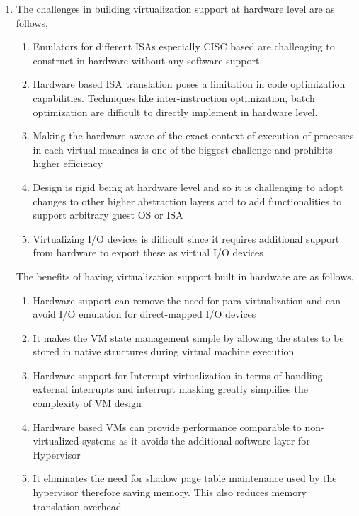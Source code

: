\documentclass[11pt,a4paper,oneside]{article}
\begin{document}
\begin{enumerate}
	    \begin{Verbatim}
	    	      
	    \end{Verbatim}   
		
		\item The challenges in building virtualization support at hardware level are as follows,
			\begin{enumerate}
				\item Emulators for different ISAs especially CISC based are challenging to construct in hardware without any software support. 
				\item Hardware based ISA translation poses a limitation in code optimization capabilities. Techniques like inter-instruction optimization, batch optimization are difficult to directly implement in hardware level.
				\item Making the hardware aware of the exact context of execution of processes in each virtual machines is one of the biggest challenge and prohibits higher efficiency
				\item Design is rigid being at hardware level and so it is challenging to adopt changes to other higher abstraction layers and to add functionalities to support arbitrary guest OS or ISA 
				\item Virtualizing I/O devices is difficult since it requires additional support from hardware to export these as virtual I/O devices 
			\end{enumerate}
		     The benefits of having virtualization support built in hardware are as follows,
		     \begin{enumerate}
		     	\item Hardware support can remove the need for para-virtualization and can avoid I/O emulation for direct-mapped I/O devices
		     	\item It makes the VM state management simple by allowing the states to be stored in native structures during virtual machine execution
		     	\item Hardware support for Interrupt virtualization in terms of handling external interrupts and interrupt masking greatly simplifies the complexity of VM design
		     	\item Hardware based VMs can provide performance comparable to non-virtualized systems as it avoids the additional software layer for Hypervisor
		     	\item It eliminates the need for shadow page table maintenance used by the hypervisor therefore saving memory. This also reduces memory translation overhead
		     \end{enumerate}		
		

\end{enumerate}
\end{document}
